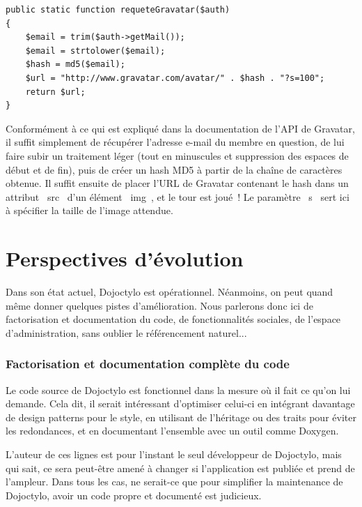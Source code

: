 \documentclass[a4paper,12pt]{article}
\begin{document}
\begin{lstlisting}
public static function requeteGravatar($auth)
{
    $email = trim($auth->getMail());
    $email = strtolower($email);
    $hash = md5($email);
    $url = "http://www.gravatar.com/avatar/" . $hash . "?s=100";
    return $url;
}
\end{lstlisting}


Conformément à ce qui est expliqué dans la documentation de l'API de Gravatar, il suffit simplement de récupérer l'adresse e-mail du membre en question, de lui faire subir un traitement léger (tout en minuscules et suppression des espaces de début et de fin), puis de créer un hash MD5 à partir de la chaîne de caractères obtenue. Il suffit ensuite de placer l'URL de Gravatar contenant le hash dans un attribut \og~src~\fg{} d'un élément \og~img~\fg, et le tour est joué~! Le paramètre \og~s~\fg{} sert ici à spécifier la taille de l'image attendue.

\newpage


\part{Perspectives d'évolution}

Dans son état actuel, Dojoctylo est opérationnel. Néanmoins, on peut quand même donner quelques pistes d'amélioration. Nous parlerons donc ici de factorisation et documentation du code, de fonctionnalités sociales, de l'espace d'administration, sans oublier le référencement naturel...

\section{Factorisation et documentation complète du code}

Le code source de Dojoctylo est fonctionnel dans la mesure où il fait ce qu'on lui demande. Cela dit, il serait intéressant d'optimiser celui-ci en intégrant davantage de design patterns pour le style, en utilisant de l'héritage ou des traits pour éviter les redondances, et en documentant l'ensemble avec un outil comme Doxygen.

L'auteur de ces lignes est pour l'instant le seul développeur de Dojoctylo, mais qui sait, ce sera peut-être amené à changer si l'application est publiée et prend de l'ampleur. Dans tous les cas, ne serait-ce que pour simplifier la maintenance de Dojoctylo, avoir un code propre et documenté est judicieux.
\end{document}
